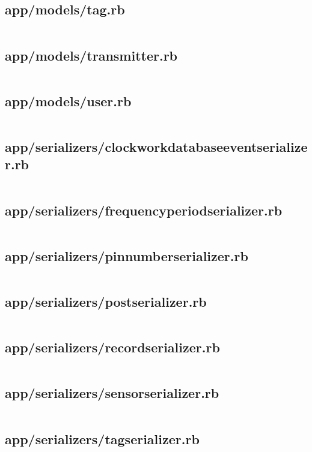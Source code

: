 \documentclass[letterpaper, 12 pt]{article}
\begin{document}
\subsection{app/models/tag.rb}
\inputminted{ruby}{../app/models/tag.rb}
\subsection{app/models/transmitter.rb}
\inputminted{ruby}{../app/models/transmitter.rb}
\subsection{app/models/user.rb}
\inputminted{ruby}{../app/models/user.rb}

\subsection{app/serializers/clockwork\textunderscore database\textunderscore event\textunderscore serializer.rb}
\inputminted{ruby}{../app/serializers/clockwork_database_event_serializer.rb}
\subsection{app/serializers/frequency\textunderscore period\textunderscore serializer.rb}
\inputminted{ruby}{../app/serializers/frequency_period_serializer.rb}
\subsection{app/serializers/pin\textunderscore number\textunderscore serializer.rb}
\inputminted{ruby}{../app/serializers/pin_number_serializer.rb}
\subsection{app/serializers/post\textunderscore serializer.rb}
\inputminted{ruby}{../app/serializers/post_serializer.rb}
\subsection{app/serializers/record\textunderscore serializer.rb}
\inputminted{ruby}{../app/serializers/record_serializer.rb}
\subsection{app/serializers/sensor\textunderscore serializer.rb}
\inputminted{ruby}{../app/serializers/sensor_serializer.rb}
\subsection{app/serializers/tag\textunderscore serializer.rb}
\inputminted{ruby}{../app/serializers/tag_serializer.rb}
\end{document}
